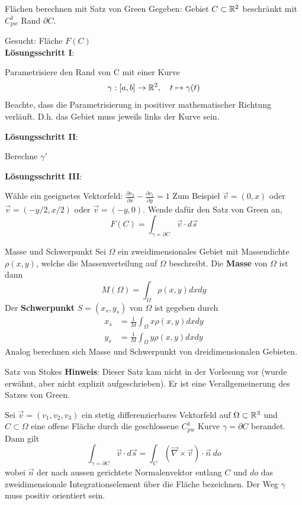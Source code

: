 \begin{Rezept}[label=GreenFlaechen]{Flächen berechnen mit Satz von Green}{}
	Gegeben: Gebiet $C \subset \mathbb{R}^2$ beschränkt mit $C^1_{pw}$ Rand $\partial C$.
	
	Gesucht: Fläche $F(C)$\\
	
	\textbf{Lösungsschritt I}:
	
	Parametrisiere den Rand von C mit einer Kurve
	\[
  		\gamma:[a, b] \to \mathbb{R}^2,\quad t \mapsto \gamma(t)
	\]
	Beachte, dass die Parametrisierung in positiver mathematischer Richtung verläuft. D.h. das Gebiet muss jeweils links der Kurve sein.
	
	\textbf{Lösungsschritt II}:
	
	Berechne $\gamma'$

	\textbf{Lösungsschritt III}:
	
	Wähle ein geeignetes Vektorfeld:
	$\frac{\partial v_2}{\partial x} -\frac{\partial v_1}{\partial y} = 1$ 
	Zum Beispiel $\vec v = (0, x)$ oder $\vec v = (-y/2, x/2)$ oder $\vec v = (-y, 0)$.
	Wende dafür den Satz von Green an,
	\[
  		F(C) =
  		\int_{\gamma=\partial C} \vec{v} \cdot d\vec{s}
	\]
\end{Rezept}

\begin{Satz}{Masse und Schwerpunkt}{}
	Sei $\Omega$ ein zweidimensionales Gebiet mit Massendichte $\rho(x, y)$, welche die Massenverteilung auf $\Omega$ beschreibt. Die \textbf{Masse} von $\Omega$ ist dann	
	\[
		M(\Omega) = \int_\Omega \rho(x, y) dx dy
	\]
	Der \textbf{Schwerpunkt} $S=(x_s, y_s)$ von $\Omega$ ist gegeben durch
	\begin{align*}
		x_s &= \frac{1}{M} \int_\Omega x \rho (x, y) dx dy\\
		y_s &= \frac{1}{M} \int_\Omega y \rho (x, y) dx dy
	\end{align*} 
	Analog berechnen sich Masse und Schwerpunkt von dreidimensionalen Gebieten.
\end{Satz}

\begin{Satz}{Satz von Stokes}{}
	\textbf{Hinweis}: Dieser Satz kam nicht in der Vorlesung vor (wurde erwähnt, aber nicht explizit aufgeschrieben). Er ist eine Verallgemeinerung des Satzes von Green.
	
	Sei $\vec{v} = (v_1, v_2, v_3)$ ein stetig differenzierbares Vektorfeld auf $\Omega \subset \mathbb{R}^3$ und $C \subset \Omega$ eine offene Fläche durch die geschlossene $C^1_{pw}$ Kurve $\gamma = \partial C$ berandet. Dann gilt
	\[
		\int_{\gamma=\partial C} \vec{v} \cdot d\vec{s} = 
		\int_C (\vec \nabla \times \vec v) \cdot \vec n\ do
	\]
	wobei $\vec n$ der nach aussen gerichtete Normalenvektor entlang $C$ und $do$ das zweidimensionale Integrationselement über die Fläche bezeichnen. Der Weg $\gamma$ muss positiv orientiert sein.	
	
\end{Satz}

